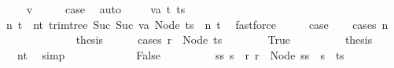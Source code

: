 \begin{isabellebody}
\isamarkupfalse%
\isanewline
\ \ \isamarkupfalse%
\ {\isacharparenleft}{\kern0pt}{}\ v{\isacharparenright}{\kern0pt}\isanewline
\ \ \isamarkupfalse%
\ \isamarkupfalse%
\ {\isacharquery}{\kern0pt}case\ \isamarkupfalse%
\ auto\isanewline
{}\isamarkupfalse%
\isanewline
\ \ \isamarkupfalse%
\ {\isacharparenleft}{\kern0pt}{}\ va\ t\ ts{\isacharparenright}{\kern0pt}\isanewline
\ \ \isamarkupfalse%
\ n{}\ t{}\ \ nt{}{\isacharcolon}{\kern0pt}\ {\isachardoublequoteopen}trim{\isacharunderscore}{\kern0pt}tree\ {\isacharparenleft}{\kern0pt}Suc\ {\isacharparenleft}{\kern0pt}Suc\ va{\isacharparenright}{\kern0pt}{\isacharparenright}{\kern0pt}\ {\isacharparenleft}{\kern0pt}Node\ ts{\isacharparenright}{\kern0pt}\ {\isacharequal}{\kern0pt}\ {\isacharparenleft}{\kern0pt}n{}{\isacharcomma}{\kern0pt}\ t{}{\isacharparenright}{\kern0pt}{\isachardoublequoteclose}\ \isamarkupfalse%
\ fastforce\isanewline
\ \ \isamarkupfalse%
\ \isamarkupfalse%
\ {\isacharquery}{\kern0pt}case\isanewline
\ \ \isamarkupfalse%
\ {\isacharparenleft}{\kern0pt}cases\ n{}{\isacharparenright}{\kern0pt}\isanewline
\ \ \ \ \isamarkupfalse%
\ {}\isanewline
\ \ \ \ \isamarkupfalse%
\ \isamarkupfalse%
\ {\isacharquery}{\kern0pt}thesis\isanewline
\ \ \ \ \isamarkupfalse%
\ {\isacharparenleft}{\kern0pt}cases\ {\isachardoublequoteopen}r\ {\isasymle}\ Node\ ts{\isachardoublequoteclose}{\isacharparenright}{\kern0pt}\isanewline
\ \ \ \ \ \ \isamarkupfalse%
\ True\isanewline
\ \ \ \ \ \ \isamarkupfalse%
\ \isamarkupfalse%
\ {\isacharquery}{\kern0pt}thesis\ \isamarkupfalse%
\ {}\ {}\ nt{}\ \isamarkupfalse%
\ simp\isanewline
\ \ \ \ \isamarkupfalse%
\isanewline
\ \ \ \ \ \ \isamarkupfalse%
\ False\isanewline
\ \ \ \ \ \ \isamarkupfalse%
\ \isamarkupfalse%
\ ss\ s\ \ r{\isacharcolon}{\kern0pt}\ {\isachardoublequoteopen}r\ {\isacharequal}{\kern0pt}\ Node\ {\isacharparenleft}{\kern0pt}ss\ {\isacharat}{\kern0pt}\ s\ {\isacharhash}{\kern0pt}\ ts{\isacharparenright}{\kern0pt}{\isachardoublequoteclose}\ \isamarkupfalse%

\end{isabellebody}
